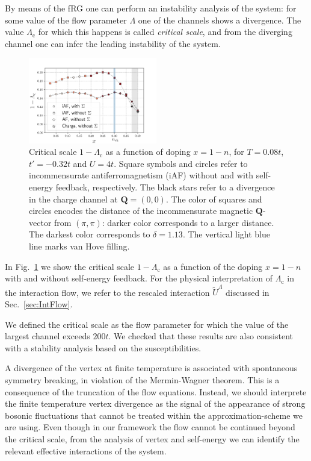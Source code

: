 By means of the fRG one can perform an instability analysis of the system: 
for some value of the flow parameter $\Lambda$ one of the channels shows a divergence. 
The value $\Lambda_{\mathrm{c}} $ for which this happens is called \textit{critical scale}, and from the diverging channel one can infer the leading instability of the system. 
%
\begin{figure}
\includegraphics[width=0.5\textwidth]{images/phasediag.png}
\caption{Critical scale $1-\Lambda_{\mathrm{c}}$ as a function of doping $x=1-n$, for $T = 0.08t$, $t'=-0.32t$ and $U=4t$. 
Square symbols and circles refer to incommensurate antiferromagnetism (iAF) without and with self-energy feedback, respectively.
The black stars refer to a divergence in the charge channel at $\mathbf{Q} = (0,0)$.
The color of squares and circles encodes the distance of the incommensurate magnetic $\mathbf{Q}$-vector from $(\pi,\pi)$: darker color corresponds to a larger distance. The darkest color corresponds to $\delta=1.13$. 
The vertical light blue line marks van Hove filling.}  
\label{fig:criscale} 
\end{figure}
%
In Fig.~\ref{fig:criscale} we show the critical scale $1-\Lambda_{\mathrm{c}}$ as a function of the doping $x=1-n$ with and without self-energy feedback.
For the physical interpretation of $\Lambda_\mathrm{c}$ in the interaction flow, we refer to the rescaled interaction\cite{Honerkamp2004} $\tilde U ^\Lambda$ discussed in Sec.~\ref{sec:IntFlow}.  

We defined the critical scale as the flow parameter for which the value of the largest channel exceeds $200t$. We checked that these results are also consistent with a stability analysis based on the susceptibilities.        

A divergence of the vertex at finite temperature is associated with spontaneous symmetry breaking, in violation of the Mermin-Wagner theorem.\cite{Mermin1966}
This is a consequence of the truncation of the flow equations.
Instead, we should interprete the finite temperature vertex divergence as the signal of the appearance of strong bosonic fluctuations that cannot be treated within the approximation-scheme we are using.\cite{Salmhofer2001} 
Even though in our framework the flow cannot be continued beyond the critical scale, from the analysis of vertex and self-energy we can identify the relevant effective interactions of the system.

